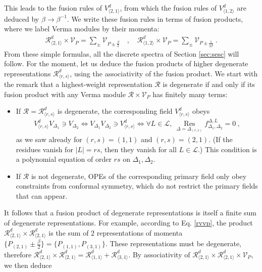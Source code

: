 \documentclass[12pt, a4paper]{article}
\begin{document}
This leads to the fusion rules of $V^d_{\langle 2,1\rangle}$, from which the fusion rules of $V^d_{\langle 1,2\rangle}$ are deduced by $\beta\to \beta^{-1}$. We write these fusion rules in terms of fusion products, where we label Verma modules by their momenta:
\begin{align}
 \boxed{\mathcal{R}^d_{\langle 2,1\rangle}\times \mathcal{V}_P = \sum_\pm \mathcal{V}_{P\pm \frac{\beta}{2}}} \quad, \quad \boxed{\mathcal{R}^d_{\langle 1,2\rangle}\times \mathcal{V}_P = \sum_\pm \mathcal{V}_{P\pm \frac{1}{2\beta}}}\ . 
 \label{rvvp}
\end{align}
From these simple formulas, all the discrete spectra of Section \ref{sec:sesc} will follow. For the moment, let us deduce the fusion products of higher degenerate representations $\mathcal{R}^d_{\langle r,s\rangle}$, using the associativity of the fusion product. We start with the remark that a highest-weight representation $\mathcal{R}$ is degenerate if and only if its fusion product with any Verma module $\mathcal{R}\times \mathcal{V}_P$ has finitely many terms:
\begin{itemize}
 \item If $\mathcal{R}=\mathcal{R}^d_{\langle r,s\rangle}$ is degenerate, the corresponding field $V^d_{\langle r,s\rangle}$ obeys
 \begin{align}
V^d_{\langle r,s\rangle} V_{\Delta_1}\ni V_{\Delta_2} \iff V_{\Delta_1}V_{\Delta_2} \ni V^d_{\langle r,s\rangle} \iff\forall L\in \mathcal{L},\  \underset{\Delta=\Delta_{(r,s)}}{\operatorname{Res}} f^{\Delta,L}_{\Delta_1,\Delta_2}=0\ ,
\end{align}
 as we saw already for $(r,s)=(1,1)$ and $(r,s)=(2,1)$. (If the residues vanish for $|L|=rs$, then they vanish for all $L\in\mathcal{L}$.) This condition is a polynomial equation of order $rs$ on $\Delta_1,\Delta_2$.

 \item If $\mathcal{R}$ is not degenerate, OPEs of the corresponding primary field
 only obey constraints from conformal symmetry, which do not restrict the primary fields that can appear.
\end{itemize}
It follows that a fusion product of degenerate representations is itself a finite sum of degenerate representations. 
For example, according to Eq. \eqref{rvvp}, the product $\mathcal{R}^d_{\langle 2,1\rangle}\times\mathcal{R}^d_{\langle 2,1\rangle}$ is the sum of 2 representations of momenta $\{P_{(2,1)} \pm \frac{\beta}{2}\} = \{P_{(1,1)},P_{(3,1)}\}$. These representations must be degenerate, therefore $\mathcal{R}^d_{\langle 2,1\rangle}\times\mathcal{R}^d_{\langle 2,1\rangle}=\mathcal{R}^d_{\langle 1,1\rangle}+\mathcal{R}^d_{\langle 3,1\rangle}$. By associativity of $\mathcal{R}^d_{\langle 2,1\rangle}\times\mathcal{R}^d_{\langle 2,1\rangle}\times \mathcal{V}_P$, we then deduce
\end{document}
